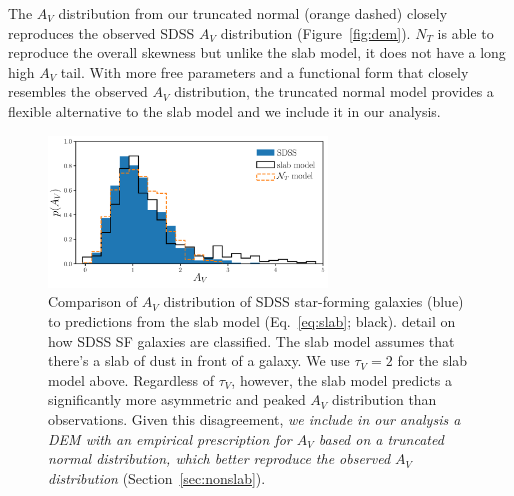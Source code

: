 The $A_V$ distribution from our truncated normal (orange dashed) closely
reproduces the observed SDSS $A_V$ distribution (Figure~\ref{fig:dem}). $N_T$
is able to reproduce the overall skewness but unlike the slab model, it does
not have a long high $A_V$ tail. With more free parameters and a functional
form that closely resembles the observed $A_V$ distribution, the truncated
normal model provides a flexible alternative to the slab model and we include
it in our analysis.  

\begin{figure}
    \begin{center}
        \includegraphics[width=0.66\textwidth]{figs/slab_tnorm.pdf} 
        \caption{\label{fig:av_dist}
            Comparison of $A_V$ distribution of SDSS star-forming
        galaxies (blue) to predictions from the slab model (Eq.~\ref{eq:slab};
        black). {\color{red} detail on how SDSS SF galaxies are classified.} 
        The slab model assumes that there's a slab of dust in front of a galaxy.
        We use $\tau_V=2$ for the slab model above. Regardless of $\tau_V$,
        however, the slab model predicts a significantly more asymmetric and peaked $A_V$ distribution
        than observations. Given this disagreement, {\em we include in our
        analysis a DEM with an empirical prescription for $A_V$ based on a truncated normal 
        distribution, which better reproduce the observed $A_V$ distribution} (Section~\ref{sec:nonslab}). }
    \end{center}
\end{figure}





